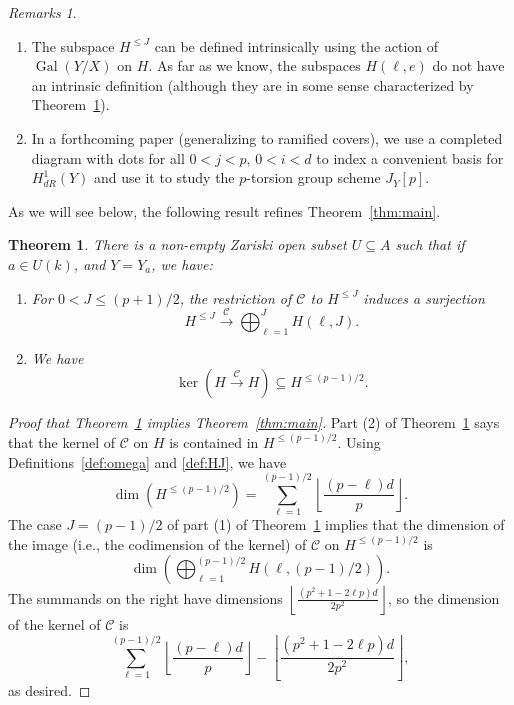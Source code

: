 \documentclass[12pt,reqno]{amsart}
\newcommand{\bry}[1]{{\color{red} \sf $\bigstar\bigstar$ [#1]}}
\numberwithin{equation}{section}
\theoremstyle{plain}
\newtheorem{thm}[subsection]{Theorem}
\theoremstyle{definition}
\theoremstyle{remark}
\newtheorem{rems}[subsection]{Remarks}
\numberwithin{equation}{section}
\newcommand{\CC}{\mathcal{C}}
\newcommand{\<}{\langle}
\renewcommand{\>}{\rangle}
\newcommand{\labeledlongto}[1]{\overset{#1}{\longrightarrow}}
\DeclareMathOperator{\gal}{Gal}
\def\HlJ{H^{\le J}}
\begin{document}
\begin{rems}\mbox{}
  \begin{enumerate}
  \item The subspace $\HlJ$ can be defined intrinsically using the
    action of $\gal(Y/X)$ on $H$.  As far as we know, the subspaces
    $H(\ell,e)$ do not have an intrinsic definition (although they are
    in some sense characterized by Theorem~\ref{thm:ref1}).
  \item In a forthcoming %
    paper (generalizing \cite{CaisUlmer25} to ramified covers), we use
    a completed diagram with dots for all $0<j<p$, $0<i<d$ to index a
    convenient basis for $H^1_{dR}(Y)$ and use it to study the
    $p$-torsion group scheme $J_Y[p]$.
  \end{enumerate}
\end{rems}

As we will see below, the following result refines
Theorem~\ref{thm:main}.

\begin{thm}\label{thm:ref1} There is a non-empty Zariski open subset $U\subseteq
  A$ such that if $a\in U(k)$, and $Y=Y_a$, we have:
  \begin{enumerate}
  \item For $0<J\le(p+1)/2$, the restriction of $\CC$ to
    $H^{\le J}$ induces a surjection    
    \[H^{\le J}\labeledlongto{\CC}
     \bigoplus_{\ell=1}^{J}
      H(\ell,J).\]
  \item We have
    \[\ker\left(H\labeledlongto{\CC} H\right)\subseteq H^{\le (p-1)/2}.\]
  \end{enumerate}
\end{thm}

\begin{proof}[Proof that Theorem~\ref{thm:ref1} implies
  Theorem~\ref{thm:main}]
  Part (2) of Theorem~\ref{thm:ref1} says that the kernel of $\CC$ on
  $H$ is contained in $H^{\le(p-1)/2}$.  Using
  Definitions~\ref{def:omega} and \ref{def:HJ}, we have
  \[\dim \left(H^{\le(p-1)/2}\right)=
    \sum_{\ell=1}^{(p-1)/2}\left\lfloor\frac{(p-\ell)d}{p}\right\rfloor.\]
  The case $J=(p-1)/2$ of part (1) of Theorem~\ref{thm:ref1} implies
  that the dimension of the image (i.e., the codimension of the kernel)
  of $\CC$ on $H^{\le(p-1)/2}$ is
  \[\dim \left(\bigoplus_{\ell=1}^{(p-1)/2} H(\ell,(p-1)/2)\right).\]
  The summands on the right have dimensions
  $\left\lfloor\frac{(p^2+1-2\ell p)d}{2p^2}\right\rfloor$, so the
  dimension of the kernel of $\CC$ is
\[\sum_{\ell=1}^{(p-1)/2}
    \left\lfloor\frac{(p-\ell)d}{p}\right\rfloor
    -\left\lfloor\frac{(p^2+1-2\ell p)d}{2p^2}\right\rfloor,\]
as desired.
\end{proof}
\end{document}
